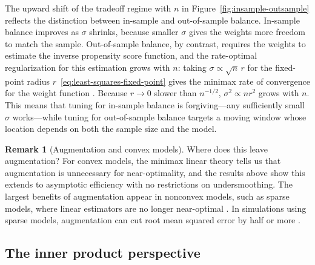 \documentclass{article}
\theoremstyle{definition}
\newtheorem{remark}{Remark}
\newcommand{\<}{\langle}
\renewcommand{\>}{\rangle}
\begin{document}
The upward shift of the tradeoff regime with $n$ in Figure~\ref{fig:insample-outsample} reflects the distinction between in-sample and out-of-sample balance. In-sample balance improves as $\sigma$ shrinks, because smaller $\sigma$ gives the weights more freedom to match the sample. Out-of-sample balance, by contrast, requires the weights to estimate the inverse propensity score function, and the rate-optimal regularization for this estimation grows with $n$: taking $\sigma \propto \sqrt{n}\, r$ for the fixed-point radius $r$~\eqref{eq:least-squares-fixed-point} gives the minimax rate of convergence for the weight function \citep[Section~3.3]{hirshberg2021augmented}. Because $r \to 0$ slower than $n^{-1/2}$, $\sigma^2 \propto n r^2$ grows with $n$. This means that tuning for in-sample balance is forgiving---any sufficiently small $\sigma$ works---while tuning for out-of-sample balance targets a moving window whose location depends on both the sample size and the model.

\begin{remark}[Augmentation and convex models]
\label{remark:augmentation-convex}
Where does this leave augmentation? For convex models, the minimax linear theory tells us that augmentation is unnecessary for near-optimality, and the results above show this extends to asymptotic efficiency with no restrictions on undersmoothing. The largest benefits of augmentation appear in nonconvex models, such as sparse models, where linear estimators are no longer near-optimal \citep{cai2004minimax}. In simulations using sparse models, augmentation can cut root mean squared error by half or more \citep[Section~6, Setup~2]{hirshberg2021augmented}.
\end{remark}

\subsection{The inner product perspective}%
\label{sec:inner-product}
\end{document}
